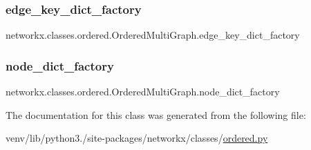 \subsubsection{\texorpdfstring{edge\+\_\+key\+\_\+dict\+\_\+factory}{edge\_key\_dict\_factory}}
{\footnotesize\ttfamily networkx.\+classes.\+ordered.\+Ordered\+Multi\+Graph.\+edge\+\_\+key\+\_\+dict\+\_\+factory\hspace{0.3cm}{\ttfamily [static]}}

\mbox{\label{classnetworkx_1_1classes_1_1ordered_1_1OrderedMultiGraph_a71c05fb5ec3d75bbeedf14fde6ac8afd}} 
\subsubsection{\texorpdfstring{node\+\_\+dict\+\_\+factory}{node\_dict\_factory}}
{\footnotesize\ttfamily networkx.\+classes.\+ordered.\+Ordered\+Multi\+Graph.\+node\+\_\+dict\+\_\+factory\hspace{0.3cm}{\ttfamily [static]}}



The documentation for this class was generated from the following file\+:\begin{DoxyCompactItemize}
\item 
venv/lib/python3./site-\/packages/networkx/classes/\hyperlink{ordered_8py}{ordered.\+py}\end{DoxyCompactItemize}
